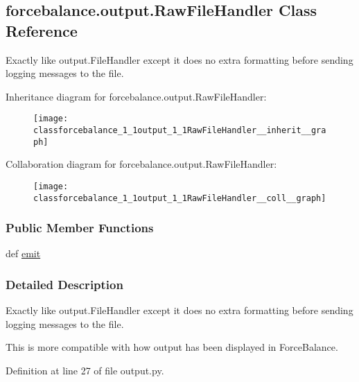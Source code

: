 \hypertarget{classforcebalance_1_1output_1_1RawFileHandler}{\subsection{forcebalance.\-output.\-Raw\-File\-Handler Class Reference}
\label{classforcebalance_1_1output_1_1RawFileHandler}
}


Exactly like output.\-File\-Handler except it does no extra formatting before sending logging messages to the file.  




Inheritance diagram for forcebalance.\-output.\-Raw\-File\-Handler\-:\nopagebreak
\begin{figure}[H]
\begin{center}
\leavevmode
\texttt{[image: classforcebalance\_1\_1output\_1\_1RawFileHandler\_\_inherit\_\_graph]}
\end{center}
\end{figure}


Collaboration diagram for forcebalance.\-output.\-Raw\-File\-Handler\-:\nopagebreak
\begin{figure}[H]
\begin{center}
\leavevmode
\texttt{[image: classforcebalance\_1\_1output\_1\_1RawFileHandler\_\_coll\_\_graph]}
\end{center}
\end{figure}
\subsubsection*{Public Member Functions}
\begin{DoxyCompactItemize}
\item 
def \hyperlink{classforcebalance_1_1output_1_1RawFileHandler_a55d391dbd042a51aa1d15106151eecd3}{emit}
\end{DoxyCompactItemize}


\subsubsection{Detailed Description}
Exactly like output.\-File\-Handler except it does no extra formatting before sending logging messages to the file. 

This is more compatible with how output has been displayed in Force\-Balance. 

Definition at line 27 of file output.\-py.



